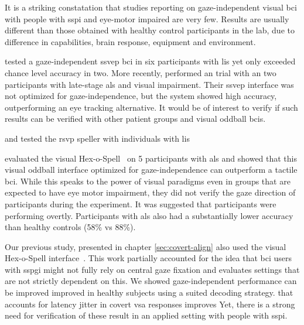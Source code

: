 It is a striking constatation that studies reporting on
gaze-independent visual \ac{bci} with people with \ac{sspi} and eye-motor
impaired are very few.
Results are usually different than those obtained with healthy control
participants in the lab, due to difference in capabilities, brain
response, equipment and environment.

\textcite{Lesenfants2014} tested a gaze-independent \ac{ssvep} \ac{bci} in six
participants with \ac{lis} yet only exceeded chance level accuracy in two.
More recently, \textcite{Peters2020} performed an trial with an
two participants with late-stage \ac{als} and visual impairment.
Their \ac{ssvep} interface was not optimized for gaze-independence, but the
system showed high accuracy, outperforming an eye tracking alternative.
It would be of interest to verify if such results can be verified with other
patient groups and visual oddball \acp{bci}.

\textcite{Orhan2012} and \textcite{Oken2014} tested the \ac{rsvp} speller with
individuals with \ac{lis}

\textcite{Severens2014} evaluated the visual Hex-o-Spell~\cite{Treder2010} on 5
participants with \ac{als} and showed that this visual oddball interface optimized
for gaze-independence can outperform a tactile \ac{bci}.
While this speaks to the power of visual paradigms even in groups that are
expected to have eye motor impairment, they did not verify the gaze direction
of participants during the experiment.
It was suggested that participants were performing overtly.
Participants with \ac{als} also had a substantially lower accuracy than healthy
controls (58\% vs 88\%).




Our previous study, presented in chapter \autoref{sec:covert-align} also used the
visual Hex-o-Spell interface~\cite{VanDenKerchove2024}.
This work partially accounted for the idea that \ac{bci} users with \ac{sspgi} might
not fully rely on central gaze fixation and evaluates settings that are not
strictly dependent on this.
We showed gaze-independent performance can be improved
improved in healthy subjects using a suited decoding strategy.
that accounts for latency jitter in covert \ac{vsa} responses improves
Yet, there is a strong need for verification of these result in an applied
setting with people with \ac{sspi}.


